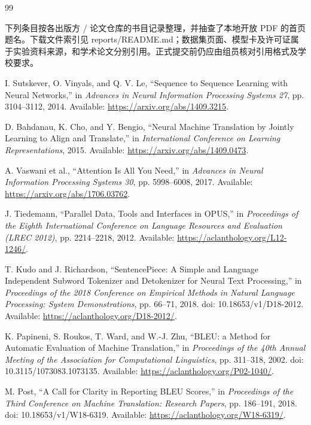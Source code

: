 \documentclass[UTF8,a4paper,12pt,fontset=none]{ctexart}
\begin{document}
\begin{thebibliography}{99}
\item[] {\footnotesize 下列条目按各出版方 / 论文仓库的书目记录整理，并抽查了本地开放 PDF 的首页题名。下载文件索引见 reports/README.md；数据集页面、模型卡及许可证属于实验资料来源，和学术论文分别引用。正式提交前仍应由组员核对引用格式及学校要求。}

 I. Sutskever, O. Vinyals, and Q. V. Le, ``Sequence to Sequence Learning with Neural Networks,'' in \textit{Advances in Neural Information Processing Systems 27}, pp. 3104--3112, 2014. Available: \url{https://arxiv.org/abs/1409.3215}.

 D. Bahdanau, K. Cho, and Y. Bengio, ``Neural Machine Translation by Jointly Learning to Align and Translate,'' in \textit{International Conference on Learning Representations}, 2015. Available: \url{https://arxiv.org/abs/1409.0473}.

 A. Vaswani et al., ``Attention Is All You Need,'' in \textit{Advances in Neural Information Processing Systems 30}, pp. 5998--6008, 2017. Available: \url{https://arxiv.org/abs/1706.03762}.

 J. Tiedemann, ``Parallel Data, Tools and Interfaces in OPUS,'' in \textit{Proceedings of the Eighth International Conference on Language Resources and Evaluation (LREC 2012)}, pp. 2214--2218, 2012. Available: \url{https://aclanthology.org/L12-1246/}.

 T. Kudo and J. Richardson, ``SentencePiece: A Simple and Language Independent Subword Tokenizer and Detokenizer for Neural Text Processing,'' in \textit{Proceedings of the 2018 Conference on Empirical Methods in Natural Language Processing: System Demonstrations}, pp. 66--71, 2018. doi: 10.18653/v1/D18-2012. Available: \url{https://aclanthology.org/D18-2012/}.

 K. Papineni, S. Roukos, T. Ward, and W.-J. Zhu, ``BLEU: a Method for Automatic Evaluation of Machine Translation,'' in \textit{Proceedings of the 40th Annual Meeting of the Association for Computational Linguistics}, pp. 311--318, 2002. doi: 10.3115/1073083.1073135. Available: \url{https://aclanthology.org/P02-1040/}.

 M. Post, ``A Call for Clarity in Reporting BLEU Scores,'' in \textit{Proceedings of the Third Conference on Machine Translation: Research Papers}, pp. 186--191, 2018. doi: 10.18653/v1/W18-6319. Available: \url{https://aclanthology.org/W18-6319/}.


\end{thebibliography}
\end{document}

